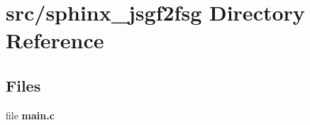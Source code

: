 \section{src/sphinx\+\_\+jsgf2fsg Directory Reference}
\label{dir_230350dfe14c7dfc5f22a5c64471a6f5}
\subsection*{Files}
\begin{DoxyCompactItemize}
\item 
file {\bfseries main.\+c}
\end{DoxyCompactItemize}
